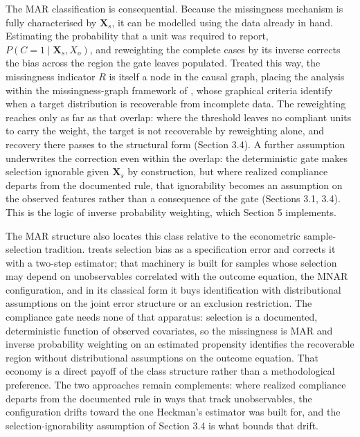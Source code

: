 The MAR classification is consequential. Because the missingness mechanism is fully characterised by $\mathbf{X}_s$, it can be modelled using the data already in hand. Estimating the probability that a unit was required to report, $P(C = 1 \mid \mathbf{X}_s, X_o)$, and reweighting the complete cases by its inverse corrects the bias across the region the gate leaves populated. Treated this way, the missingness indicator $R$ is itself a node in the causal graph, placing the analysis within the missingness-graph framework of , whose graphical criteria identify when a target distribution is recoverable from incomplete data. The reweighting reaches only as far as that overlap: where the threshold leaves no compliant units to carry the weight, the target is not recoverable by reweighting alone, and recovery there passes to the structural form (Section 3.4). A further assumption underwrites the correction even within the overlap: the deterministic gate makes selection ignorable given $\mathbf{X}_s$ by construction, but where realized compliance departs from the documented rule, that ignorability becomes an assumption on the observed features rather than a consequence of the gate (Sections 3.1, 3.4). This is the logic of inverse probability weighting, which Section 5 implements.

The MAR structure also locates this class relative to the econometric sample-selection tradition.  treats selection bias as a specification error and corrects it with a two-step estimator; that machinery is built for samples whose selection may depend on unobservables correlated with the outcome equation, the MNAR configuration, and in its classical form it buys identification with distributional assumptions on the joint error structure or an exclusion restriction. The compliance gate needs none of that apparatus: selection is a documented, deterministic function of observed covariates, so the missingness is MAR and inverse probability weighting on an estimated propensity identifies the recoverable region without distributional assumptions on the outcome equation. That economy is a direct payoff of the class structure rather than a methodological preference. The two approaches remain complements: where realized compliance departs from the documented rule in ways that track unobservables, the configuration drifts toward the one Heckman's estimator was built for, and the selection-ignorability assumption of Section 3.4 is what bounds that drift.

